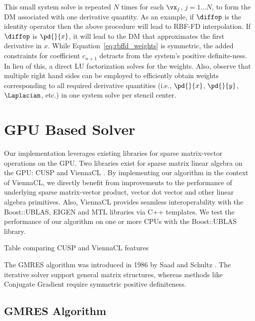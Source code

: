This small system solve is repeated $N$ times for each $\vx_j$, $j=1...N$, to form the DM associated with one derivative quantity.
As an example, if $\diffop$ is the identity operator then the above procedure will lead to RBF-FD interpolation. If $\diffop$ is $\pd{}{x}$, it will lead to the DM that approximates the first derivative in $x$. %
While Equation~\ref{eq:rbffd_weights} is symmetric, the added constraints for coefficient $c_{n+1}$ detracts from the system's positive definite-ness. In lieu of this, a direct LU factorization solves for the weights. 
Also, observe that multiple right hand sides can be employed to efficiently obtain weights corresponding to all required derivative quantities (i.e., $\pd{}{x}$, $\pd{}{y}$, $\Laplacian$, etc.) in one system solve per stencil center.


\section{GPU Based Solver}



Our implementation leverages existing libraries for sparse matrix-vector operations on the GPU. Two libraries exist for sparse matrix linear algebra on the GPU: CUSP \cite{Bell2009} and ViennaCL \cite{Rupp2010}. By implementing our algorithm in the context of ViennaCL, we directly benefit from improvements to the performance of underlying sparse matrix-vector product, vector dot vector and other linear algebra primitives. Also, ViennaCL provides seamless interoperability with the Boost::UBLAS, EIGEN and MTL libraries via C++ templates. We test the performance of our algorithm on one or more CPUs with the Boost::UBLAS library. 

{\color{blue} Table comparing CUSP and ViennaCL features} 

The GMRES algorithm was introduced in 1986 by Saad and Schultz \cite{Saad1986}. The iterative solver support general matrix structures, whereas methods like Conjugate Gradient require symmetric positive definiteness. 

\subsection{GMRES Algorithm} 

